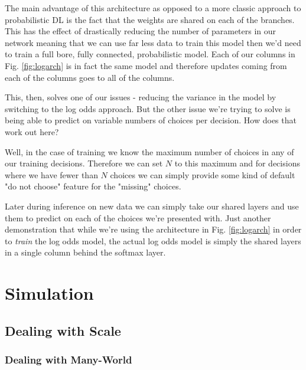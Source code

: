 \documentclass[11pt]{article}
\begin{document}
The main advantage of this architecture as opposed to a more classic approach to probabilistic DL is the fact that the weights are shared on each of the branches. This has the effect of drastically reducing the number of parameters in our network meaning that we can use far less data to train this model then we'd need to train a full bore, fully connected, probabilistic model. Each of our columns in Fig. \ref{fig:logarch} is in fact the same model and therefore updates coming from each of the columns goes to all of the columns.

This, then, solves one of our issues - reducing the variance in the model by switching to the log odds approach. But the other issue we're trying to solve is being able to predict on variable numbers of choices per decision. How does that work out here?\newline

Well, in the case of training we know the maximum number of choices in any of our training decisions. Therefore we can set $N$ to this maximum and for decisions where we have fewer than $N$ choices we can simply provide some kind of default "do not choose" feature for the "missing" choices. 

Later during inference on new data we can simply take our shared layers and use them to predict on each of the choices we're presented with. Just another demonstration that while we're using the architecture in Fig. \ref{fig:logarch} in order to \textit{train} the log odds model, the actual log odds model is simply the shared layers in a single column behind the softmax layer. 




















\newpage
\section{Simulation}

\subsection{Dealing with Scale}

\subsubsection{Dealing with Many-World}
\end{document}
